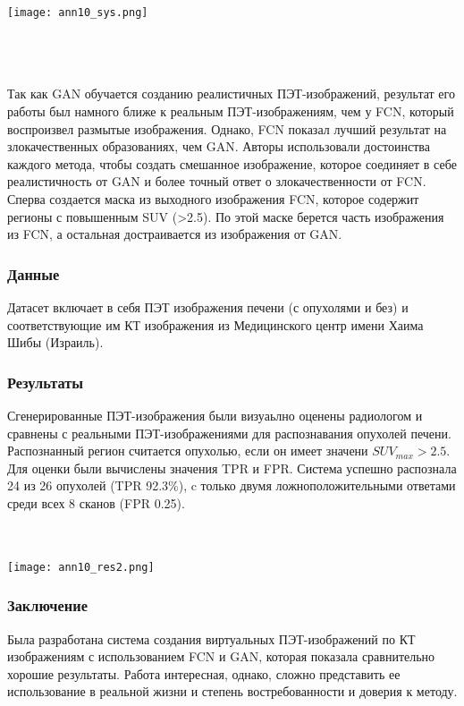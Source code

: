 \begin{minipage}{1.0\linewidth}
    \begin{center}
        \texttt{[image: ann10\_sys.png]} \\
    \end{center}
    
\end{minipage}
\\
\\
\\
Так как GAN обучается созданию реалистичных ПЭТ-изображений, результат его 
работы был намного ближе к реальным ПЭТ-изображениям, чем у FCN, который воспроизвел 
размытые изображения. Однако, FCN показал лучший результат на злокачественных
образованиях, чем GAN. Авторы использовали достоинства каждого метода, чтобы создать 
смешанное изображение, которое соединяет в себе реалистичность от GAN и более точный ответ 
о злокачественности от FCN. Сперва создается маска из выходного изображения FCN, которое 
содержит регионы с повышенным SUV (>2.5). По этой маске берется часть изображения из FCN, а 
остальная достраивается из изображения от GAN.

\subsubsection*{Данные}
Датасет включает в себя ПЭТ изображения печени (с опухолями и без) и соответствующие им
КТ изображения из Медицинского центр имени Хаима Шибы  (Израиль).
\subsubsection*{Результаты}
Сгенерированные ПЭТ-изображения были визуаьлно оценены радиологом и сравнены с реальными ПЭТ-изображениями
для распознавания опухолей печени. Распознанный регион считается опухолью, если он имеет 
значени \(SUV_{max}>2.5\).  Для оценки были вычислены значения TPR и FPR.
Система успешно распознала 24 из 26 опухолей (TPR 92.3\%), c только 
двумя ложноположительными ответами среди всех 8 сканов (FPR 0.25).
\\
\\
\\
\begin{minipage}{1.0\linewidth}
    \begin{center}
        \texttt{[image: ann10\_res2.png]} \\
    \end{center}
    
\end{minipage}
\subsubsection*{Заключение}
Была разработана система создания виртуальных ПЭТ-изображений 
по КТ изображениям с использованием FCN и GAN, которая показала 
сравнительно хорошие результаты. Работа интересная, однако, сложно представить 
ее использование в реальной жизни и степень востребованности и доверия к методу.